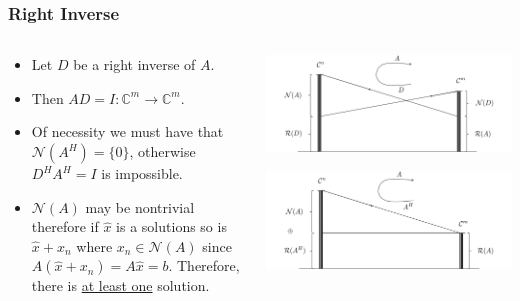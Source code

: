 \documentclass{beamer}
\begin{document}
\begin{frame}\frametitle{Right Inverse}
	\begin{columns}
		\begin{column}{0.6\textwidth}
			\begin{itemize}
			\item 	Let $D$ be a right inverse of $A$.  
			\item Then $AD=I:\mathbb{C}^m\to\mathbb{C}^m$.  
			\item Of necessity we must have that $\mathcal{N}(A^H) = \{0\}$, otherwise $D^H A^H = I$ is impossible.
			\item 	$\mathcal{N}(A)$ may be nontrivial therefore if $\hat{x}$ is a solutions so is $\hat{x} + x_n$ where $x_n \in \mathcal{N}(A)$ since $A(\hat{x}+x_n) = A\hat{x} = b$.  Therefore, there is \underline{at least one} solution.
			\end{itemize}
		\end{column}
		\begin{column}{0.5\textwidth}
			\begin{center}
	  			\includegraphics[width=\textwidth]{figures/chap4_right_inverse}	
			\end{center}
			\begin{center}	
	  			\includegraphics[width=\textwidth]{figures/chap4_right_inverse_full_rank}
			\end{center}
		\end{column}
	\end{columns}
\end{frame}
\end{document}
